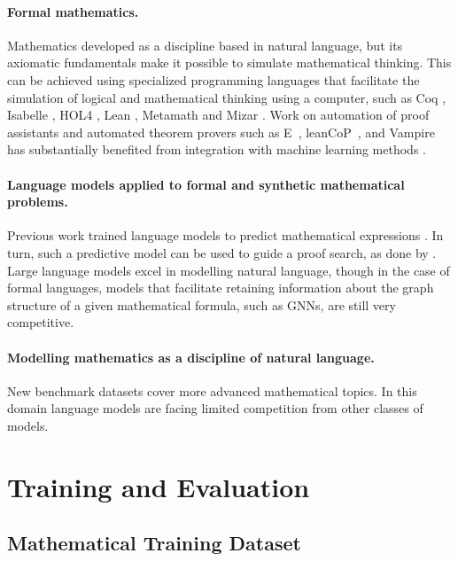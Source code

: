 \paragraph{Formal mathematics.} Mathematics developed as a discipline based in natural language, but its axiomatic fundamentals make it possible to simulate mathematical thinking. This can be achieved using specialized programming languages that facilitate the simulation of logical and mathematical thinking using a computer, such as Coq \citep{coq}, Isabelle \citep{isabelle}, HOL4 \citep{hollight}, Lean \citep{lean}, Metamath \citep{metamath} and Mizar \citep{mizar}. Work on automation of proof assistants and automated theorem provers such as E~\citep{eprover}, leanCoP~\citep{leancop}, and Vampire~\citep{vampire} has substantially benefited from integration with machine learning methods \citep{deepmath, enigma, isarstep, gptf, rlcop}.

\paragraph{Language models applied to formal and synthetic mathematical problems.} 

Previous work trained language models to predict mathematical expressions \cite{skip_trees, isarstep, gptf, lime2021, han2022pact,formal_curriculum,thor,autoform_llm}. In turn, such a predictive model can be used to guide a proof search, as done by \cite{gptf}. Large language models excel in modelling natural language, though in the case of formal languages, models that facilitate retaining information about the graph structure of a given mathematical formula, such as GNNs, are still very competitive.

\paragraph{Modelling mathematics as a discipline of natural language.} New benchmark datasets \citep{MATH, naturalproof} cover more advanced mathematical topics. In this domain language models are facing limited competition from other classes of models.

\section{Training and Evaluation}
\subsection{Mathematical Training Dataset}
\label{sec:pretraining_data}


